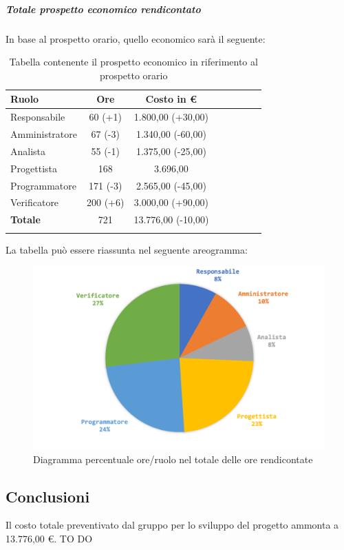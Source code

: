 		\subparagraph{Totale prospetto economico rendicontato}
		In base al prospetto orario, quello economico sarà il seguente: 
		
		\begin{longtable}{|l|c|c|c|c|c|c|c|}
			\hline
			\rowcolor{lighter-grayer}
			\textbf{Ruolo} & \textbf{Ore} & \textbf{Costo in €} \\
			\hline
			\endfirsthead
			
			\hline
			Responsabile 	    & 60 (+1) & 1.800,00 (+30,00)\\
			\hline 
			\hline
			Amministratore	  & 67 (-3) & 1.340,00 (-60,00)\\
			\hline
			\hline
			Analista 				& 55 (-1) & 1.375,00 (-25,00)\\
			\hline
			\hline
			Progettista 		  & 168 & 3.696,00\\
			\hline
			\hline
			Programmatore 	 & 171 (-3) & 2.565,00 (-45,00)\\
			\hline
			\hline
			Verificatore 		  & 200 (+6) & 3.000,00 (+90,00)\\
			\hline
			\textbf{Totale} 	& 721 & 13.776,00 (-10,00)\\
			\hline
			\caption{Tabella contenente il prospetto economico in riferimento al prospetto orario}
		\end{longtable}
		
		
		La tabella può essere riassunta nel seguente areogramma:
		\begin{figure}[H]
			\centering
			\includegraphics[width=0.8\linewidth]{./images/preventivo/totOreRed2.png}
			\caption{Diagramma percentuale ore/ruolo nel totale delle ore rendicontate}
			\label{fig:diagramma costi ruolo fase totale ore rendicontate}
		\end{figure}
		
		
		\subsection{Conclusioni}
		Il costo totale preventivato dal gruppo per lo sviluppo del progetto ammonta a 13.776,00 €.
		TO DO
		\pagebreak
				
